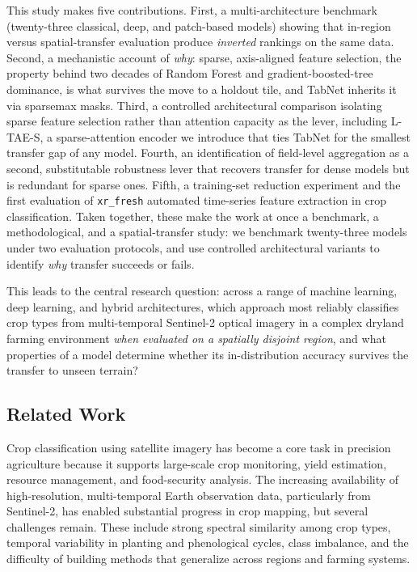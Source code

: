 \documentclass[pdflatex,sn-mathphys]{sn-jnl} %
\begin{document}
This study makes five contributions. First, a multi-architecture benchmark (twenty-three classical, deep, and patch-based models) showing that in-region versus spatial-transfer evaluation produce \emph{inverted} rankings on the same data. Second, a mechanistic account of \emph{why}: sparse, axis-aligned feature selection, the property behind two decades of Random Forest and gradient-boosted-tree dominance, is what survives the move to a holdout tile, and TabNet inherits it via sparsemax masks. Third, a controlled architectural comparison isolating sparse feature selection rather than attention capacity as the lever, including L-TAE-S, a sparse-attention encoder we introduce that ties TabNet for the smallest transfer gap of any model. Fourth, an identification of field-level aggregation as a second, substitutable robustness lever that recovers transfer for dense models but is redundant for sparse ones. Fifth, a training-set reduction experiment and the first evaluation of \texttt{xr\_fresh} automated time-series feature extraction in crop classification. Taken together, these make the work at once a benchmark, a methodological, and a spatial-transfer study: we benchmark twenty-three models under two evaluation protocols, and use controlled architectural variants to identify \emph{why} transfer succeeds or fails.

This leads to the central research question: across a range of machine learning, deep learning, and hybrid architectures, which approach most reliably classifies crop types from multi-temporal Sentinel-2 optical imagery in a complex dryland farming environment \emph{when evaluated on a spatially disjoint region}, and what properties of a model determine whether its in-distribution accuracy survives the transfer to unseen terrain?


\subsection{Related Work}

Crop classification using satellite imagery has become a core task in precision agriculture because it supports large-scale crop monitoring, yield estimation, resource management, and food-security analysis. The increasing availability of high-resolution, multi-temporal Earth observation data, particularly from Sentinel-2, has enabled substantial progress in crop mapping, but several challenges remain. These include strong spectral similarity among crop types, temporal variability in planting and phenological cycles, class imbalance, and the difficulty of building methods that generalize across regions and farming systems.
\end{document}
